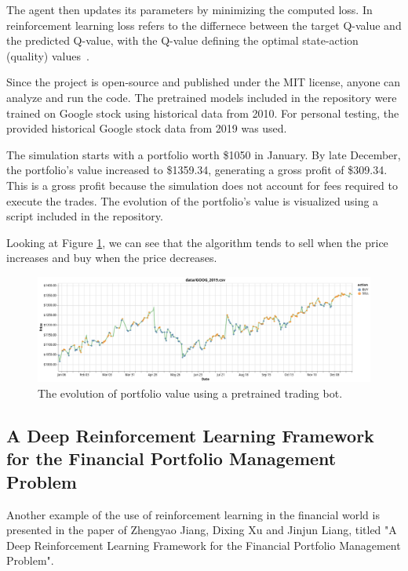 \documentclass[a4paper,oneside,onecolumn,12pt]{book}
\begin{document}
	The agent then updates its parameters by minimizing the computed loss. In reinforcement learning loss refers to the differnece between the target Q-value and the predicted Q-value, with the Q-value defining the optimal state-action (quality) values~\cite{HMLSKT}.

	Since the project is open-source and published under the MIT license, anyone can analyze and run the code. The pretrained models included in the repository were trained on Google stock using historical data from 2010. For personal testing, the provided historical Google stock data from 2019 was used.

	The simulation starts with a portfolio worth \$1050 in January. By late December, the portfolio's value increased to \$1359.34, generating a gross profit of \$309.34. This is a gross profit because the simulation does not account for fees required to execute the trades. The evolution of the portfolio's value is visualized using a script included in the repository.

	Looking at Figure \ref{fig:STBRL portfolio evolution}, we can see that the algorithm tends to sell when the price increases and buy when the price decreases.
	\begin{figure}[H]
	\begin{center}
		\includegraphics[width=\linewidth]{kep/trade_bot_visualization.png}
		\caption{The evolution of portfolio value using a pretrained trading bot.}
		\label{fig:STBRL portfolio evolution}
	\end{center}
	\end{figure}

	\subsection{A Deep Reinforcement Learning Framework for the Financial Portfolio Management Problem~\cite{ADRLFFPMP}}\label{paper_ADRLFFPMP}
	Another example of the use of reinforcement learning in the financial world is presented in the paper of Zhengyao Jiang, Dixing Xu and Jinjun Liang, titled "A Deep Reinforcement Learning Framework for the Financial Portfolio Management Problem". 
	
\end{document}
